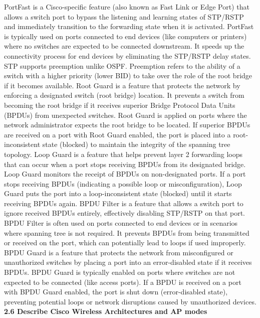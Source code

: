 \documentclass{article}
\begin{document}
	PortFast is a Cisco-specific feature (also known as Fast Link or Edge Port) that allows a switch port to bypass the listening and learning states of STP/RSTP and immediately transition to the forwarding state when it is activated. PortFast is typically used on ports connected to end devices (like computers or printers) where no switches are expected to be connected downstream. It speeds up the connectivity process for end devices by eliminating the STP/RSTP delay states. STP supports preemption unlike OSPF. Preemption refers to the ability of a switch with a higher priority (lower BID) to take over the role of the root bridge if it becomes available. Root Guard is a feature that protects the network by enforcing a designated switch (root bridge) location. It prevents a switch from becoming the root bridge if it receives superior Bridge Protocol Data Units (BPDUs) from unexpected switches. Root Guard is applied on ports where the network administrator expects the root bridge to be located. If superior BPDUs are received on a port with Root Guard enabled, the port is placed into a root-inconsistent state (blocked) to maintain the integrity of the spanning tree topology. Loop Guard is a feature that helps prevent layer 2 forwarding loops that can occur when a port stops receiving BPDUs from its designated bridge. Loop Guard monitors the receipt of BPDUs on non-designated ports. If a port stops receiving BPDUs (indicating a possible loop or misconfiguration), Loop Guard puts the port into a loop-inconsistent state (blocked) until it starts receiving BPDUs again. BPDU Filter is a feature that allows a switch port to ignore received BPDUs entirely, effectively disabling STP/RSTP on that port. BPDU Filter is often used on ports connected to end devices or in scenarios where spanning tree is not required. It prevents BPDUs from being transmitted or received on the port, which can potentially lead to loops if used improperly. BPDU Guard is a feature that protects the network from misconfigured or unauthorized switches by placing a port into an error-disabled state if it receives BPDUs. BPDU Guard is typically enabled on ports where switches are not expected to be connected (like access ports). If a BPDU is received on a port with BPDU Guard enabled, the port is shut down (error-disabled state), preventing potential loops or network disruptions caused by unauthorized devices.\\
  
\textbf{2.6 Describe Cisco Wireless Architectures and AP modes}\\
  
\end{document}
